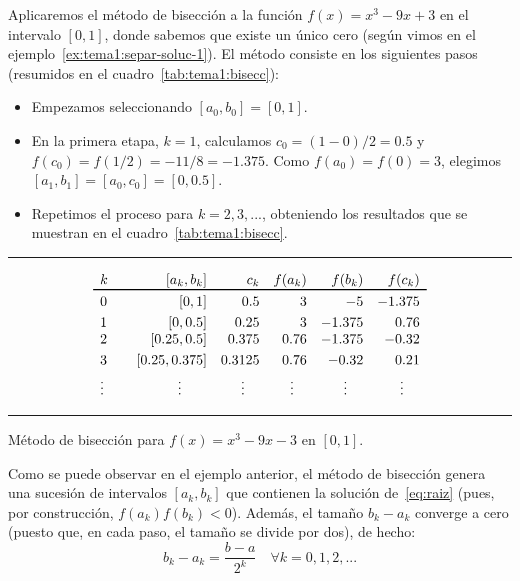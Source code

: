 \begin{example}
  Aplicaremos el método de bisección a la función $f(x)=x^3-9x+3$ en el intervalo
  $[0,1]$, donde sabemos que existe un único cero (según vimos en el
  ejemplo~\ref{ex:tema1:separ-soluc-1}). El método consiste en los
  siguientes pasos (resumidos en el cuadro~\ref{tab:tema1:bisecc}):

  \begin{itemize}
  \item Empezamos seleccionando $[a_0,b_0]=[0,1]$.
  \item En la primera etapa, $k=1$, calculamos
    $c_0=(1-0)/2=0.5$  y
    $f(c_0)=f(1/2)=-11/8=-1.375$. Como $f(a_0)=f(0)=3$, elegimos
    $[a_1,b_1]=[a_0,c_0]=[0,0.5]$.
  \item Repetimos el proceso para $k=2,3,...$, obteniendo los resultados que se
    muestran en el cuadro~\ref{tab:tema1:bisecc}.
  \end{itemize}

\end{example}
\begin{table}
  \centering
  \rule{0.99\linewidth}{1.6pt}
  \begin{equation*}
    \begin{array}{l<{\quad}rrrrr}%
      k &  [a_k,b_k] & c_k & f(a_k) & f(b_k) & f(c_k)
      \\ \toprule%
      0 & [0,1]  &  0.5 & 3 & -5 & -1.375
      \\ \noalign{\smallskip}
      1 &  [0,0.5] &  0.25 & 3 & -1.375 & 0.76
      \\ \smallskip
      2 & [0.25,0.5] & 0.375 & 0.76 & -1.375 & -0.32
      \\ \smallskip
      3& [0.25,0.375] & 0.3125 & 0.76 & -0.32 & 0.21
      \\
      \hfill \vdots \hfill~ & \hfill \vdots \hfill~ &
                                                      \hfill \vdots \hfill~ & \hfill \vdots \hfill~ &
                                                                                                      \hfill \vdots \hfill~ & \hfill \vdots \hfill~
    \end{array}
  \end{equation*}
  \rule{0.99\linewidth}{1.5pt}
  \caption{Método de bisección para $f(x)=x^3-9x-3$ en $[0,1]$.}
  \label{tab:tema1:bisecc}
\end{table}

Como se puede observar en el ejemplo anterior, el método de bisección
genera una sucesión de intervalos $[a_k,b_k]$ que
contienen la solución de~\eqref{eq:raiz} (pues, por construcción,
$f(a_k)f(b_k)<0$). Además, el tamaño $b_k-a_k$ converge a cero (puesto
que, en cada paso, el tamaño se divide por dos), de hecho:
\begin{equation}
  \label{eq:tema1:bisec:1}
  b_k-a_k = \frac{b-a}{2^k} \quad \forall k=0,1,2,...
\end{equation}

